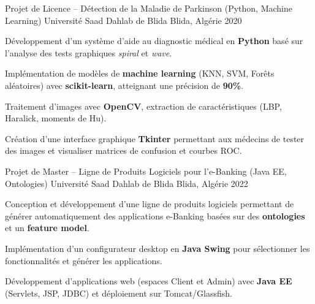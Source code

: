 \documentclass[11pt, a4paper]{awesome-cv}
\newif\ifprivatecv
\begin{document}
\makeatletter
\let\drawphoto\relax
\let\headertextwidth\relax
\let\headerphotowidth\relax
\makeatother

\ifprivatecv
	\address{\privateAddressFr}
\fi
\makecvheader[C]



\newpage



\begin{cventries}
	\cventry
	{Projet de Licence – Détection de la Maladie de Parkinson (Python, Machine Learning)}
	{Université Saad Dahlab de Blida}
	{Blida, Algérie}
	{2020}
	{
		\begin{cvitems}
			\item {Développement d’un système d’aide au diagnostic médical en \textbf{Python} basé sur l’analyse des tests graphiques \textit{spiral} et \textit{wave}.}
			\item {Implémentation de modèles de \textbf{machine learning} (KNN, SVM, Forêts aléatoires) avec \textbf{scikit-learn}, atteignant une précision de \textbf{90\%}.}
			\item {Traitement d’images avec \textbf{OpenCV}, extraction de caractéristiques (LBP, Haralick, moments de Hu).}
			\item {Création d’une interface graphique \textbf{Tkinter} permettant aux médecins de tester des images et visualiser matrices de confusion et courbes ROC.}
		\end{cvitems}
	}

	\cventry
	{Projet de Master – Ligne de Produits Logiciels pour l’e-Banking (Java EE, Ontologies)}
	{Université Saad Dahlab de Blida}
	{Blida, Algérie}
	{2022}
	{
		\begin{cvitems}
			\item {Conception et développement d’une ligne de produits logiciels permettant de générer automatiquement des applications e-Banking basées sur des \textbf{ontologies} et un \textbf{feature model}.}
			\item {Implémentation d’un configurateur desktop en \textbf{Java Swing} pour sélectionner les fonctionnalités et générer les applications.}
			\item {Développement d’applications web (espaces Client et Admin) avec \textbf{Java EE} (Servlets, JSP, JDBC) et déploiement sur Tomcat/Glassfish.}
		\end{cvitems}
	}
\end{cventries}

\end{document}
